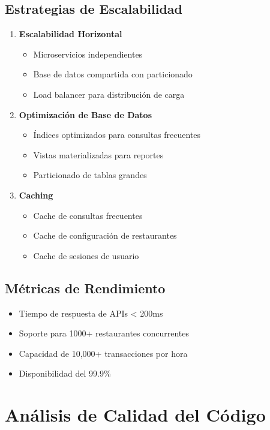 \documentclass[12pt,a4paper]{article}
\begin{document}
\subsection{Estrategias de Escalabilidad}
\begin{enumerate}
    \item \textbf{Escalabilidad Horizontal}
    \begin{itemize}
        \item Microservicios independientes
        \item Base de datos compartida con particionado
        \item Load balancer para distribución de carga
    \end{itemize}
    
    \item \textbf{Optimización de Base de Datos}
    \begin{itemize}
        \item Índices optimizados para consultas frecuentes
        \item Vistas materializadas para reportes
        \item Particionado de tablas grandes
    \end{itemize}
    
    \item \textbf{Caching}
    \begin{itemize}
        \item Cache de consultas frecuentes
        \item Cache de configuración de restaurantes
        \item Cache de sesiones de usuario
    \end{itemize}
\end{enumerate}

\subsection{Métricas de Rendimiento}
\begin{itemize}
    \item Tiempo de respuesta de APIs < 200ms
    \item Soporte para 1000+ restaurantes concurrentes
    \item Capacidad de 10,000+ transacciones por hora
    \item Disponibilidad del 99.9\%
\end{itemize}

\section{Análisis de Calidad del Código}
\end{document}
